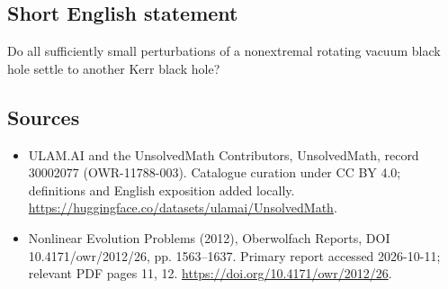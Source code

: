 \documentclass[11pt]{article}
\begin{document}
\subsection{Short English statement}
Do all sufficiently small perturbations of a nonextremal rotating vacuum black hole settle to another Kerr black hole?
\subsection{Sources}
\begin{itemize}
\item[\hypertarget{source:30002077:1}{S1}] ULAM.AI and the UnsolvedMath Contributors, UnsolvedMath, record 30002077 (OWR-11788-003). Catalogue curation under CC BY 4.0; definitions and English exposition added locally.
\url{https://huggingface.co/datasets/ulamai/UnsolvedMath}.
\item[\hypertarget{source:30002077:2}{S2}] Nonlinear Evolution Problems (2012), Oberwolfach Reports, DOI 10.4171/owr/2012/26, pp. 1563--1637. Primary report accessed 2026-10-11; relevant PDF pages 11, 12.
\url{https://doi.org/10.4171/owr/2012/26}.
\end{itemize}
\label{end:30002077}
\end{document}
